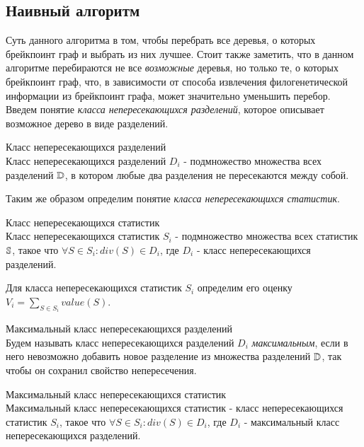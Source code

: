 \subsection{Наивный алгоритм}
Суть данного алгоритма в том, чтобы перебрать все деревья, о которых  брейкпоинт граф и выбрать из них лучшее.
Стоит также заметить, что в данном алгоритме перебираются не все \emph{возможные} деревья, но только те, о которых  брейкпоинт граф,
что, в зависимости от способа извлечения филогенетической информации из брейкпоинт графа, может значительно уменьшить перебор.
Введем понятие \textit{класса непересекающихся разделений}, которое описывает возможное дерево в виде разделений.
\begin{define}{Класс непересекающихся разделений} \\
  Класс непересекающихся разделений $D_i$ - подмножество множества всех разделений $\mathbb{D}$,
  в котором любые два разделения не пересекаются между собой.
\end{define}

\noindent Таким же образом определим понятие \textit{класса непересекающихся статистик}.
\begin{define}{Класс непересекающихся статистик}\\
  Класс непересекающихся статистик $S_i$ - подмножество множества всех статистик $\mathbb{S}$,
  такое что $\forall S \in S_i: div(S) \in D_i$,
  где $D_i$ -  класс непересекающихся разделений.
\end{define}

\noindent Для класса непересекающихся статистик $S_i$ определим его оценку \\
$V_i = \sum\nolimits_{S \in S_i} value(S)$.

\begin{define}{Максимальный класс непересекающихся разделений} \\
  Будем называть класс непересекающихся разделений $D_i$ \textit{максимальным},
  если в него невозможно добавить новое разделение из множества разделений $\mathbb{D}$,
  так чтобы он сохранил свойство непересечения.
\end{define}

\begin{define}{Максимальный класс непересекающихся статистик} \\
  Максимальный класс непересекающихся статистик - класс непересекающихся статистик $S_i$,
  такое что $\forall S \in S_i: div(S) \in D_i$,
  где $D_i$ - максимальный класс непересекающихся разделений.
\end{define}


